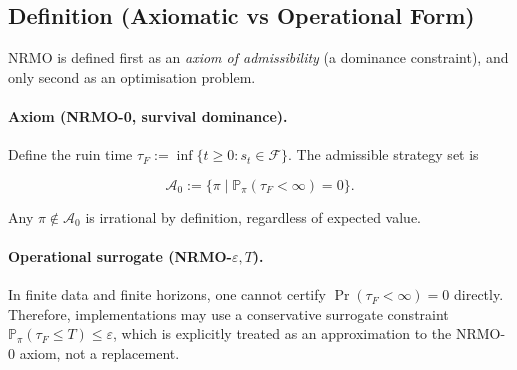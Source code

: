 \subsection{Definition (Axiomatic vs Operational Form)}
\label{sec:foundations-3-1-definition}

NRMO is defined first as an \emph{axiom of admissibility} (a
dominance constraint), and only second as an optimisation problem.

\paragraph{Axiom (NRMO-0, survival dominance).}
Define the ruin time $\tau_F := \inf\{t \ge 0 : s_t \in
\mathcal{F}\}$. The admissible strategy set is

\begin{equation}
\mathcal{A}_0 := \bigl\{\pi \mid \mathbb{P}_\pi(\tau_F < \infty) = 0\bigr\}.
\label{eq:foundations-A-zero}
\end{equation}

Any $\pi \notin \mathcal{A}_0$ is irrational by definition,
regardless of expected value.

\paragraph{Operational surrogate (NRMO-$\varepsilon, T$).}
In finite data and finite horizons, one cannot certify
$\Pr(\tau_F < \infty) = 0$ directly. Therefore, implementations may
use a conservative surrogate constraint
$\mathbb{P}_\pi(\tau_F \le T) \le \varepsilon$, which is explicitly
treated as an approximation to the NRMO-0 axiom, not a replacement.



